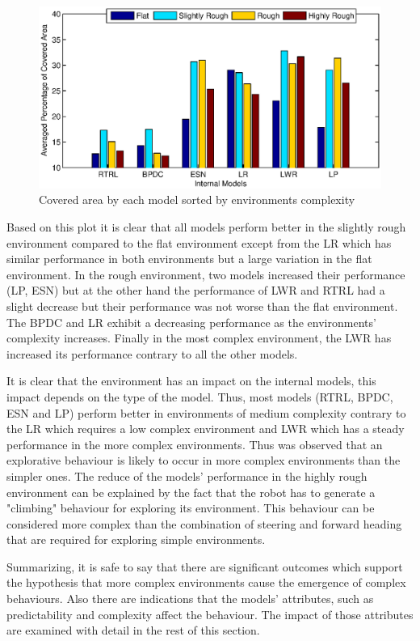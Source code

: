 \documentclass[msc,ai,logo]{infthesis}
\begin{document}
\begin{figure}[H]
\includegraphics[scale=0.8]{Area_sortEnv.eps}
\centering
\caption{Covered area by each model sorted by environments complexity  }
\label{fig:Area_sortEnv}
\end{figure}

Based on this plot it is clear that all models perform better in the slightly rough environment compared to the flat environment except from the LR which has similar performance in both environments but a large variation in the flat environment. In the rough environment, two models increased their performance (LP, ESN) but at the other hand the performance of LWR and RTRL had a slight decrease but their performance was not worse than the flat environment. The BPDC and LR exhibit a decreasing performance as the environments' complexity increases. Finally in the most complex environment, the LWR has increased its performance contrary to all the other models.   

It is clear that the environment has an impact on the internal models, this impact depends on the type of the model. Thus, most models (RTRL, BPDC, ESN and LP) perform better in environments of medium complexity contrary to the LR which requires a low complex environment and LWR which has a steady performance in the more complex environments. Thus was observed that an explorative behaviour is likely to occur in more complex environments than the simpler ones. The reduce of the models' performance in the highly rough environment can be explained by the fact that the robot has to generate a "climbing" behaviour for exploring its environment. This behaviour can be considered more complex than the combination of steering and forward heading that are required for exploring simple environments.

Summarizing, it is safe to say that there are significant outcomes which support the hypothesis that more complex environments cause the emergence of complex behaviours. Also there are indications that the models' attributes, such as predictability and complexity affect the behaviour. The impact of those attributes are examined with detail in the rest of this section.    
\end{document}
